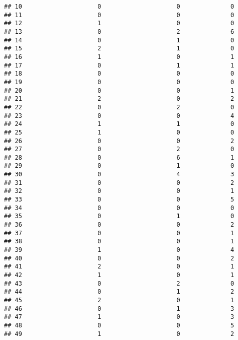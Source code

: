 \documentclass[
]{article}
\begin{document}
\begin{verbatim}
## 10                     0                     0              0
## 11                     0                     0              0
## 12                     1                     0              0
## 13                     0                     2              6
## 14                     0                     1              0
## 15                     2                     1              0
## 16                     1                     0              1
## 17                     0                     1              1
## 18                     0                     0              0
## 19                     0                     0              0
## 20                     0                     0              1
## 21                     2                     0              2
## 22                     0                     2              0
## 23                     0                     0              4
## 24                     1                     1              0
## 25                     1                     0              0
## 26                     0                     0              2
## 27                     0                     2              0
## 28                     0                     6              1
## 29                     0                     1              0
## 30                     0                     4              3
## 31                     0                     0              2
## 32                     0                     0              1
## 33                     0                     0              5
## 34                     0                     0              0
## 35                     0                     1              0
## 36                     0                     0              2
## 37                     0                     0              1
## 38                     0                     0              1
## 39                     1                     0              4
## 40                     0                     0              2
## 41                     2                     0              1
## 42                     1                     0              1
## 43                     0                     2              0
## 44                     0                     1              2
## 45                     2                     0              1
## 46                     0                     1              3
## 47                     1                     0              3
## 48                     0                     0              5
## 49                     1                     0              2

\end{verbatim}
\end{document}
